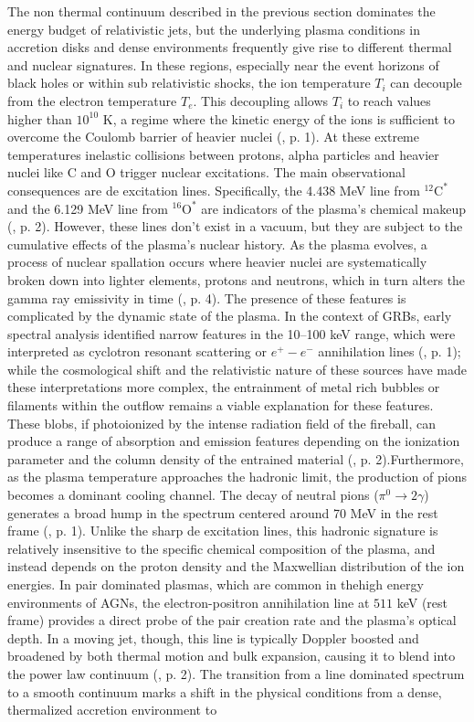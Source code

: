 \documentclass{aa} %
\begin{document}
The non thermal continuum described in the previous section dominates the energy budget of relativistic jets, but the underlying plasma conditions in accretion disks and dense environments frequently give rise to different thermal and nuclear signatures. In these regions, especially near the event horizons of black holes or within sub relativistic shocks, the ion temperature $T_i$ can decouple from the electron temperature $T_e$. This decoupling allows $T_i$ to reach values higher than $10^{10}$ K, a regime where the kinetic energy of the ions is sufficient to overcome the Coulomb barrier of heavier nuclei (\citet{Kafexhiuetal2019}, p. 1). At these extreme temperatures inelastic collisions between protons, alpha particles and heavier nuclei like C and O trigger nuclear excitations. The main observational consequences are de excitation lines. Specifically, the 4.438 MeV line from $^{12}\text{C}^*$ and the 6.129 MeV line from $^{16}\text{O}^*$ are indicators of the plasma's chemical makeup (\citet{Kafexhiuetal2019}, p. 2). However, these lines don't exist in a vacuum, but they are subject to the cumulative effects of the plasma's nuclear history. As the plasma evolves, a process of nuclear spallation occurs where heavier nuclei are systematically broken down into lighter elements, protons and neutrons, which in turn alters the gamma ray emissivity in time (\citet{Kafexhiuetal2019}, p. 4). The presence of these features is complicated by the dynamic state of the plasma. In the context of GRBs, early spectral analysis identified narrow features in the 10–100 keV range, which were interpreted as cyclotron resonant scattering or $e^+-e^-$ annihilation lines (\citet{Haileyetal1999}, p. 1); while the cosmological shift and the relativistic nature of these sources have made these interpretations more complex, the entrainment of metal rich bubbles or filaments within the outflow remains a viable explanation for these features. These blobs, if photoionized by the intense radiation field of the fireball, can produce a range of absorption and emission features depending on the ionization parameter and the column density of the entrained material (\citet{Haileyetal1999}, p. 2).Furthermore, as the plasma temperature approaches the hadronic limit, the production of pions becomes a dominant cooling channel. The decay of neutral pions ($\pi^0 \rightarrow 2\gamma$) generates a broad hump in the spectrum centered around 70 MeV in the rest frame (\citet{Kafexhiuetal2019}, p. 1). Unlike the sharp de excitation lines, this hadronic signature is relatively insensitive to the specific chemical composition of the plasma, and instead depends on the proton density and the Maxwellian distribution of the ion energies. In pair dominated plasmas, which are common in thehigh energy environments of AGNs, the electron-positron annihilation line at $511$ keV (rest frame) provides a direct probe of the pair creation rate and the plasma's optical depth. In a moving jet, though, this line is typically Doppler boosted and broadened by both thermal motion and bulk expansion, causing it to blend into the power law continuum (\citet{Boettcheretal1996}, p. 2). The transition from a line dominated spectrum to a smooth continuum marks a shift in the physical conditions from a dense, thermalized accretion environment to 
\end{document}
